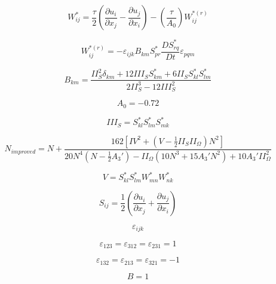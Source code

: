 \begin{equation}
W_{ij}^* = \frac{\tau}{2} \left( \frac{\partial u_i}{\partial x_j} - \frac{\partial u_j}{\partial x_i} \right)
  - \left( \frac{\tau}{A_0} \right) W_{ij}^{*(r)}
\end{equation}

\begin{equation}
W_{ij}^{*(r)} = -\varepsilon_{ijk} B_{km} S_{pr}^* \frac{D S_{rq}^*}{Dt} \varepsilon_{pqm}
\end{equation}

\begin{equation}
B_{km} = \frac{II_S^2 \delta_{km} + 12 III_S S_{km}^* + 6 II_S S_{kl}^* S_{lm}^*}{2 II_S^3 - 12 III_S^2}
\end{equation}

\begin{equation}
A_0 = -0.72
\end{equation}

\begin{equation}
III_S = S_{kl}^* S_{lm}^* S_{mk}^*
\end{equation}

\begin{equation}
N_{improved} = N + \frac{162 \left[ IV^2 + \left( V - \frac{1}{2} II_S II_{\Omega} \right) N^2 \right]}
  {20 N^4 \left( N - \frac{1}{2} A_3' \right) - II_{\Omega} \left( 10 N^3 + 15 A_3' N^2 \right)
  + 10 A_3' II_{\Omega}^2}
\end{equation}

\begin{equation}
V = S_{kl}^* S_{lm}^* W_{mn}^* W_{nk}^*
\end{equation}

\begin{equation}
S_{ij} = \frac{1}{2} \left( \frac{\partial u_i}{\partial x_j} + \frac{\partial u_j}{\partial x_i} \right)
\end{equation}

\begin{equation}
\varepsilon_{ijk}
\end{equation}

\begin{equation}
\varepsilon_{123} = \varepsilon_{312} = \varepsilon_{231} = 1
\end{equation}

\begin{equation}
\varepsilon_{132} = \varepsilon_{213} = \varepsilon_{321} = -1
\end{equation}






\begin{equation}
B=1
\end{equation}


